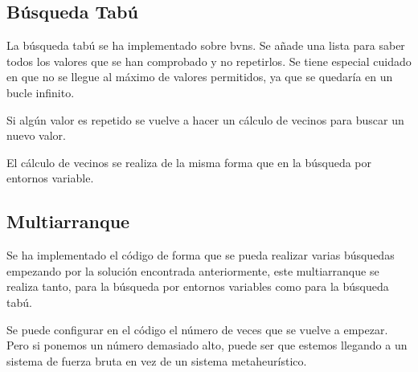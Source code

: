 \subsection{Búsqueda Tabú}
La búsqueda tabú se ha implementado sobre bvns. Se añade una lista para saber todos los valores que se han comprobado y no repetirlos. Se tiene especial cuidado en que no se llegue al máximo de valores permitidos, ya que se quedaría en un bucle infinito.

Si algún valor es repetido se vuelve a hacer  un cálculo de vecinos para buscar un nuevo valor.

El cálculo de vecinos se realiza de la misma forma que en la búsqueda por entornos variable.

\subsection{Multiarranque}

Se ha implementado el código de forma que se pueda realizar varias búsquedas empezando por la solución encontrada anteriormente, este multiarranque se realiza tanto, para la búsqueda por entornos variables como para la búsqueda tabú.

Se puede configurar en el código el número de veces que se vuelve a empezar. Pero si ponemos un número demasiado alto, puede ser que estemos llegando a un sistema de fuerza bruta en vez de un sistema metaheurístico.